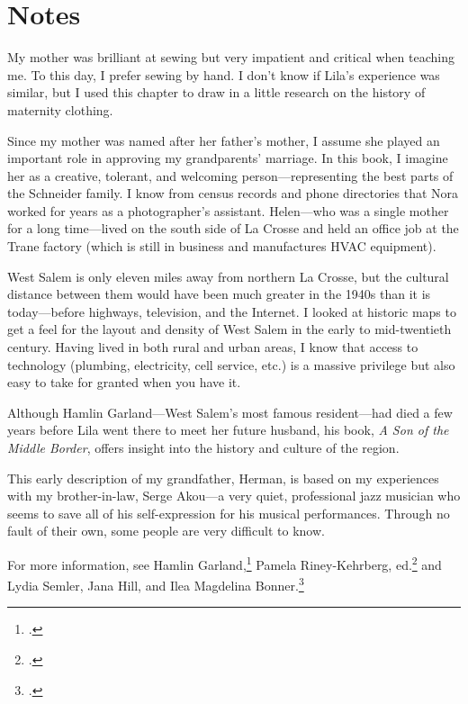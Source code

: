 \documentclass[
  american,
  letterpaper,
]{book}
\begin{document}
\section{Notes}\label{notes-34}

My mother was brilliant at sewing but very impatient and critical when
teaching me. To this day, I prefer sewing by hand. I don't know if
Lila's experience was similar, but I used this chapter to draw in a
little research on the history of maternity clothing.

Since my mother was named after her father's mother, I assume she played
an important role in approving my grandparents' marriage. In this book,
I imagine her as a creative, tolerant, and welcoming
person---representing the best parts of the Schneider family. I know
from census records and phone directories that Nora worked for years as
a photographer's assistant. Helen---who was a single mother for a long
time---lived on the south side of La Crosse and held an office job at
the Trane factory (which is still in business and manufactures HVAC
equipment).

West Salem is only eleven miles away from northern La Crosse, but the
cultural distance between them would have been much greater in the 1940s
than it is today---before highways, television, and the Internet. I
looked at historic maps to get a feel for the layout and density of West
Salem in the early to mid-twentieth century. Having lived in both rural
and urban areas, I know that access to technology (plumbing,
electricity, cell service, etc.) is a massive privilege but also easy to
take for granted when you have it.

Although Hamlin Garland---West Salem's most famous resident---had died a
few years before Lila went there to meet her future husband, his book,
\emph{A Son of the Middle Border}, offers insight into the history and
culture of the region.

This early description of my grandfather, Herman, is based on my
experiences with my brother-in-law, Serge Akou---a very quiet,
professional jazz musician who seems to save all of his self-expression
for his musical performances. Through no fault of their own, some people
are very difficult to know.

For more information, see Hamlin Garland,\footnote{.}
Pamela Riney-Kehrberg, ed.\footnote{.} and
Lydia Semler, Jana Hill, and Ilea Magdelina Bonner.\footnote{.}
\end{document}
